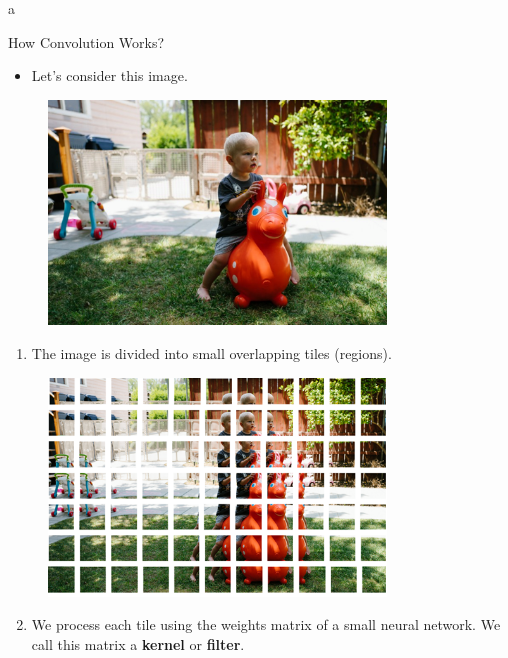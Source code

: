 a\documentclass[10pt]{beamer}
\theoremstyle{remark}
\theoremstyle{definition}
\begin{document}
\begin{frame}[allowframebreaks]{How Convolution Works?}

\begin{itemize}
    \item Let's consider this image.
\end{itemize}

\begin{figure}\includegraphics[width=0.8\textwidth,height=0.8\textheight,keepaspectratio]{./images/conv_2.png}
\end{figure}

\framebreak

\begin{enumerate}
    \item The image is divided into small overlapping tiles (regions).
\end{enumerate}

\begin{figure}
\centering
\includegraphics[width=0.8\textwidth,height=0.8\textheight,keepaspectratio]{./images/conv_3.png}
\end{figure}

\framebreak

\begin{enumerate}
    \setcounter{enumi}{1}
    \item We process each tile using the weights matrix of a small neural network. We call this matrix a \textbf{kernel} or \textbf{filter}.
\end{enumerate}


\end{frame}
\end{document}
